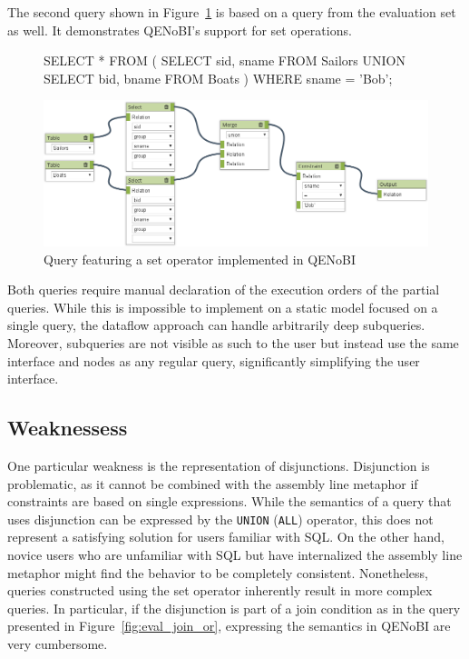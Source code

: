 \documentclass[11pt,a4paper]{globis-book}
\begin{document}
The second query shown in Figure~\ref{fig:eval_query2} is based on a query from the evaluation set as well. It demonstrates QENoBI's support for set operations.

\begin{figure}[h]
\begin{codeex}[]
SELECT *
FROM (
    SELECT sid, sname
    FROM Sailors
  UNION
    SELECT bid, bname
    FROM Boats
)
WHERE
  sname = 'Bob';
\end{codeex}

  \centering
  \includegraphics[width=\textwidth]{resources/EvalQuery2.png}
  \caption{Query featuring a set operator implemented in QENoBI}
  \label{fig:eval_query2}
\end{figure}

Both queries require manual declaration of the execution orders of the partial queries. While this is impossible to implement on a static model focused on a single query, the dataflow approach can handle arbitrarily deep subqueries. Moreover, subqueries are not visible as such to the user but instead use the same interface and nodes as any regular query, significantly simplifying the user interface.

\subsection{Weaknessess}
\label{sec:weaknesses}
One particular weakness is the representation of disjunctions. Disjunction is problematic, as it cannot be combined with the assembly line metaphor if constraints are based on single expressions. While the semantics of a query that uses disjunction can be expressed by the \texttt{UNION} (\texttt{ALL}) operator, this does not represent a satisfying solution for users familiar with SQL. On the other hand, novice users who are unfamiliar with SQL but have internalized the assembly line metaphor might find the behavior to be completely consistent. Nonetheless, queries constructed using the set operator inherently result in more complex queries. In particular, if the disjunction is part of a join condition as in the query presented in Figure~\ref{fig:eval_join_or}, expressing the semantics in QENoBI are very cumbersome.
\end{document}
